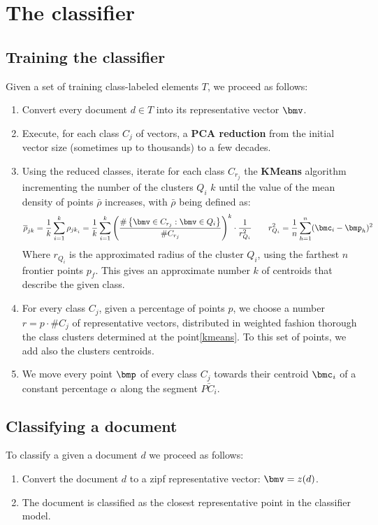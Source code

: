 \documentclass[\main/main.tex]{subfiles}
\begin{document}
\chapter{The classifier}

\section{Training the classifier}
Given a set of training class-labeled elements \(T\), we proceed as follows:
\begin{enumerate}
  \item Convert every document \(d \in T\) into its representative vector \(\bmv \).
  \item Execute, for each class \(C_j\) of vectors, a \textbf{PCA reduction} from the initial vector size (sometimes up to thousands) to a few decades.
  \item Using the reduced classes, iterate for each class \(C_{r_j}\) the \textbf{KMeans} algorithm incrementing the number of the clusters \(Q_i\) \(k\) until the value of the mean density of points \(\bar{\rho} \) increases, with \(\bar{\rho} \) being defined as:
        \[
          \bar{\rho}_{jk} = \frac{1}{k} \sum_{i=1}^k \rho_{{jk}_i} = \frac{1}{k} \sum_{i=1}^k \rnd{\frac{\arity{\bmv \in C_{r_j}:\bmv \in Q_i}}{\#C_{r_j}}}^k \cdot \frac{1}{r_{Q_i}^2} \qquad r_{Q_i}^2 = \frac{1}{n} \sum_{h=1}^{n} (\bmc_i - \bmp_h)^2
        \]
        Where \(r_{Q_i}\) is the approximated radius of the cluster \(Q_i\), using the farthest \(n\) frontier points \(p_f\).
        This gives an approximate number \(k\) of centroids that describe the given class.\label{kmeans}
  \item For every class \(C_j\), given a percentage of points \(p\), we choose a number \(r=p\cdot \# C_j\) of representative vectors, distributed in weighted fashion thorough the class clusters determined at the point\ref{kmeans}. To this set of points, we add also the clusters centroids.
  \item We move every point \(\bmp \) of every class \(C_j\) towards their centroid \(\bmc_i\) of a constant percentage \(\alpha \) along the segment \(\bar{PC_i}\).
\end{enumerate}

\section{Classifying a document}
To classify a given a document \(d\) we proceed as follows:
\begin{enumerate}
  \item Convert the document \(d\) to a zipf representative vector: \(\bmv = z(d)\).
  \item The document is classified as the closest representative point in the classifier model.
\end{enumerate}
\end{document}
